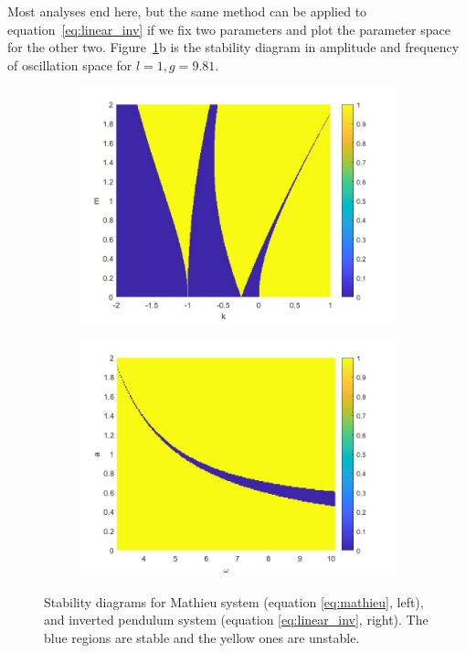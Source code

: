 \documentclass[12pt, letterpaper]{article}
\begin{document}
Most analyses end here, but the same method can be applied to equation~\eqref{eq:linear_inv} if we fix two parameters and plot the parameter space for the other two. Figure~\ref{fig:stab_diag_mathieu}b is the stability diagram in amplitude and frequency of oscillation space for $l=1, g=9.81$.  

\begin{figure}[h]
    \centering
    \begin{subfigure}[b]{0.45\textwidth}
        \centering
        \includegraphics[width=\linewidth]{Stab_Diag_Floq_mathieu.jpg}
    \end{subfigure}
    \hfill
    \begin{subfigure}[b]{0.45\textwidth}
        \centering
        \includegraphics[width=\linewidth]{Stab_Diag_Floq_invPend.jpg}
    \end{subfigure}
    \caption{Stability diagrams for Mathieu system (equation \ref{eq:mathieu}, left), and inverted pendulum system (equation \ref{eq:linear_inv}, right). The blue regions are stable and the yellow ones are unstable.}
    \label{fig:stab_diag_mathieu}
\end{figure}
\end{document}
